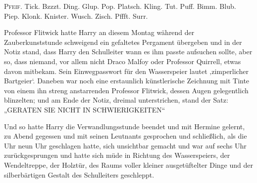 

\lettrine{P}{feif.} Tick. Bzzzt. Ding. Glup. Pop. Platsch. Kling. Tut. Puff. Bimm. Blub. Piep. Klonk. Knister. Wusch. Zisch. Pffft. Surr.

Professor Flitwick hatte Harry an diesem Montag während der Zauberkunststunde schweigend ein gefaltetes Pergament übergeben und in der Notiz stand, dass Harry den Schulleiter wann es ihm passte aufsuchen sollte, aber so, dass niemand, vor allem nicht Draco Malfoy oder Professor Quirrell, etwas davon mitbekam. Sein Einwegpasswort für den Wasserspeier lautet ‚zimperlicher Bartgeier‘.%
Daneben war noch eine erstaunlich künstlerische Zeichnung mit Tinte von einem ihn streng anstarrenden Professor Flitwick, dessen Augen gelegentlich blinzelten; und am Ende der Notiz, dreimal unterstrichen, stand der Satz: „GERATEN SIE NICHT IN SCHWIERIGKEITEN“

Und so hatte Harry die Verwandlungsstunde beendet und mit Hermine gelernt, zu Abend gegessen und mit seinen Leutnants gesprochen und schließlich, als die Uhr neun Uhr geschlagen hatte, sich unsichtbar gemacht und war auf sechs Uhr zurückgesprungen und hatte sich müde in Richtung des Wasserspeiers, der Wendeltreppe, der Holztür, des Raums voller kleiner ausgetüftelter Dinge und der silberbärtigen Gestalt des Schulleiters geschleppt.

